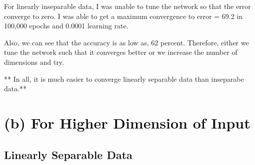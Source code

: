 \documentclass[11pt]{article}
\begin{document}
    For linearly inseparable data, I was unable to tune the network so that
the error converge to zero. I was able to get a maximum convergence to
error = 69.2 in 100,000 epochs and 0.0001 learning rate.

Also, we can see that the accuracy is as low as, 62 percent. Therefore,
either we tune the network such that it converges better or we increase
the number of dimensions and try.

** In all, it is much easier to converge linearly separable data than
inseparabe data.**

    \section{(b) For Higher Dimension of
Input}\label{b-for-higher-dimension-of-input}

\subsection{Linearly Separable Data}\label{linearly-separable-data}
\end{document}
